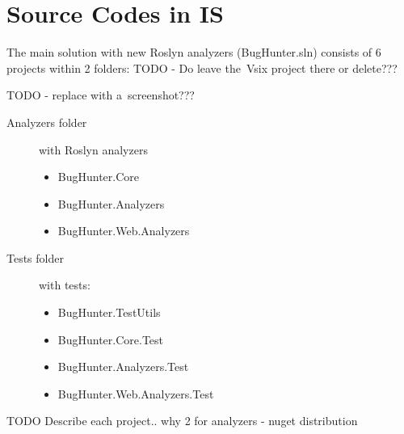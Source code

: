 \documentclass[
  digital, %
  table,   %
  lof,     %
  lot,     %
  oneside,
]{fithesis3}
\begin{document}
	\makeatletter\thesis@blocks@clear\makeatother

	\printindex
    
  \printbibliography

\appendix %
\chapter{Source Codes in IS}
\label{appendix:source-codes}
  The main solution with new Roslyn analyzers (BugHunter.sln) consists of 6 projects within 2 folders: TODO - Do leave the~Vsix project there or delete???

TODO - replace with a~screenshot???
\begin{description}
  \item[Analyzers folder] with Roslyn analyzers
  \begin{itemize}
    \item BugHunter.Core
    \item BugHunter.Analyzers
    \item BugHunter.Web.Analyzers
  \end{itemize}
  
  \item[Tests folder] with tests:
  \begin{itemize}
    \item BugHunter.TestUtils
    \item BugHunter.Core.Test
    \item BugHunter.Analyzers.Test
    \item BugHunter.Web.Analyzers.Test
  \end{itemize}
\end{description}

TODO Describe each project.. why 2 for analyzers - nuget distribution
\end{document}
